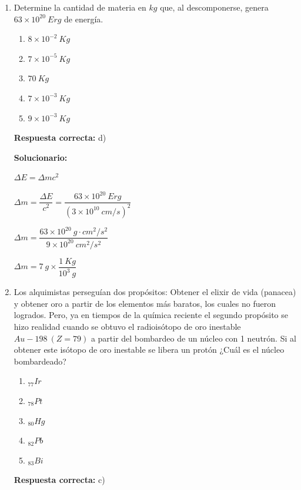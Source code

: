 \begin{enumerate}[resume]
	
	\item Determine la cantidad de materia en $kg$ que, al descomponerse, genera $63\times 10^{20}\ Erg$ de energía.
	
	\begin{enumerate}[label=\alph*)]
		\item $8\times 10^{-2}\ Kg$
		\item $7\times 10^{-5}\ Kg$
		\item $70\ Kg$
		\item $7\times 10^{-3}\ Kg$
		\item $9\times 10^{-3}\ Kg$
	\end{enumerate}
	\textbf{Respuesta correcta:} d)
	
	\vspace{2mm}
	\textbf{Solucionario:}
	
	$\Delta E=\Delta m c^2$
	
	$\Delta m=\dfrac{\Delta E}{c^2}=\dfrac{63\times 10^{20}\ Erg}{(3\times 10^{10}\ cm/s)^2}$
	
	$\Delta m=\dfrac{63\times 10^{20}\ g\cdot cm^2/s^2}{9\times 10^{20}\ cm^2/s^2}$
	
	$\Delta m=7\ g\times \dfrac{1\ Kg}{10^3\ g}$
	
	
	\vspace{6mm}
	
	\item Los alquimistas perseguían dos propósitos: Obtener el elixir de vida (panacea) y obtener oro a partir de los elementos más baratos, los cuales no fueron logrados. Pero, ya en tiempos de la química reciente el segundo propósito se hizo realidad cuando se obtuvo el radioisótopo de oro inestable $Au-198\ (Z=79)$ a partir del bombardeo de un núcleo con 1 neutrón. Si al obtener este isótopo de oro inestable se libera un protón ¿Cuál es el núcleo bombardeado?
	
	\begin{enumerate}[label=\alph*)]
		\item $_{77}Ir$
		\item $_{78}Pt$
		\item $_{80}Hg$
		\item $_{82}Pb$
		\item $_{83}Bi$
	\end{enumerate}
	\textbf{Respuesta correcta:} c)
	

\end{enumerate}
